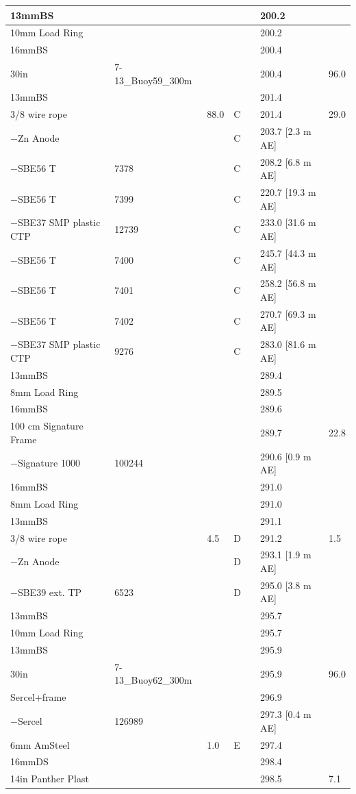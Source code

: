 \documentclass{article}
\begin{document}
\begin{tabularx}{\linewidth}{|X|X|l|l|l|X|l|}
13mmBS &  &  &  &  & 200.2 &  \\ \hline
10mm Load Ring &  &  &  &  & 200.2 &  \\ \hline
16mmBS &  &  &  &  & 200.4 &  \\ \hline
30in & 7-13\_Buoy59\_300m &  &  &  & 200.4 & 96.0 \\ \hline
13mmBS &  &  &  &  & 201.4 &  \\ \hline
3/8 wire rope &  & 88.0 & C &  & 201.4 & 29.0 \\ \hline
$-$Zn Anode &  &  & C &  & 203.7 [2.3 m AE] &  \\ \hline
$-$SBE56 T & 7378 &  & C &  & 208.2 [6.8 m AE] &  \\ \hline
$-$SBE56 T & 7399 &  & C &  & 220.7 [19.3 m AE] &  \\ \hline
$-$SBE37 SMP plastic CTP & 12739 &  & C &  & 233.0 [31.6 m AE] &  \\ \hline
$-$SBE56 T & 7400 &  & C &  & 245.7 [44.3 m AE] &  \\ \hline
$-$SBE56 T & 7401 &  & C &  & 258.2 [56.8 m AE] &  \\ \hline
$-$SBE56 T & 7402 &  & C &  & 270.7 [69.3 m AE] &  \\ \hline
$-$SBE37 SMP plastic CTP & 9276 &  & C &  & 283.0 [81.6 m AE] &  \\ \hline
13mmBS &  &  &  &  & 289.4 &  \\ \hline
8mm Load Ring &  &  &  &  & 289.5 &  \\ \hline
16mmBS &  &  &  &  & 289.6 &  \\ \hline
100 cm Signature Frame &  &  &  &  & 289.7 & 22.8 \\ \hline
$-$Signature 1000 & 100244 &  &  &  & 290.6 [0.9 m AE] &  \\ \hline
16mmBS &  &  &  &  & 291.0 &  \\ \hline
8mm Load Ring &  &  &  &  & 291.0 &  \\ \hline
13mmBS &  &  &  &  & 291.1 &  \\ \hline
3/8 wire rope &  & 4.5 & D &  & 291.2 & 1.5 \\ \hline
$-$Zn Anode &  &  & D &  & 293.1 [1.9 m AE] &  \\ \hline
$-$SBE39 ext. TP & 6523 &  & D &  & 295.0 [3.8 m AE] &  \\ \hline
13mmBS &  &  &  &  & 295.7 &  \\ \hline
10mm Load Ring &  &  &  &  & 295.7 &  \\ \hline
13mmBS &  &  &  &  & 295.9 &  \\ \hline
30in & 7-13\_Buoy62\_300m &  &  &  & 295.9 & 96.0 \\ \hline
Sercel+frame &  &  &  &  & 296.9 &  \\ \hline
$-$Sercel & 126989 &  &  &  & 297.3 [0.4 m AE] &  \\ \hline
6mm AmSteel &  & 1.0 & E &  & 297.4 &  \\ \hline
16mmDS &  &  &  &  & 298.4 &  \\ \hline
14in Panther Plast &  &  &  &  & 298.5 & 7.1 \\ \hline
\end{tabularx}
\end{document}
